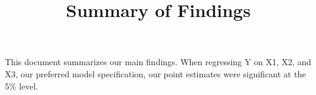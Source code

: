 \documentclass{article}
\title{Summary of Findings}
\begin{document}
\maketitle

This document summarizes our main findings. When regressing Y on X1, X2, and X3, our preferred model specification, our point estimates were significant at the 5\% level.


\end{document}

